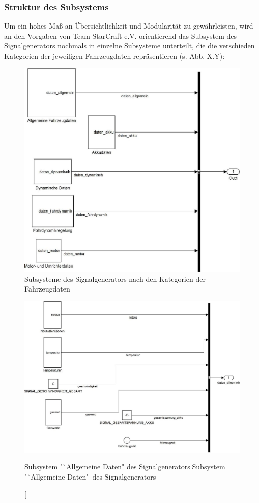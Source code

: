 \documentclass[fontsize = 12pt, paper = a4]{scrreprt}
\begin{document}
\newpage

\subsubsection{Struktur des Subsystems}

Um ein hohes Maß an Übersichtlichkeit und Modularität zu gewährleisten, wird an den Vorgaben von Team StarCraft e.V. orientierend das Subsystem des Signalgenerators nochmals in einzelne Subsysteme unterteilt, die die verschieden Kategorien der jeweiligen Fahrzeugdaten repräsentieren (s. Abb. X.Y): \\

\begin{figure}[h]
\centering
\includegraphics[scale = 0.85]{signalgen}
\caption[Subsysteme des Signalgenerators]
{Subsysteme des Signalgenerators nach den Kategorien der Fahrzeugdaten}
\end{figure}

\newpage

\begin{figure}[h]
\centering
\includegraphics[scale = 0.65]{suballgemein}
\caption[Subsystem "`Allgemeine Daten" des Signalgenerators]{Subsystem "`Allgemeine Daten"\ des Signalgenerators}
\end{figure}
\end{document}
